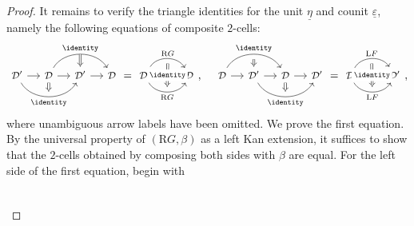 \begin{proof}
	It remains to verify the triangle identities for the unit
	$\underline{\eta}$ and counit $\underline{\varepsilon}$, namely the
	following equations of composite $2$-cells:
	\begin{equation*}\begin{gathered}
		\begin{tikzcd}[column sep=small, every cell/.append style = {font = \small}]
			\mathcal{D}' \arrow[r] \arrow[bend right=60, rr, "\identity"', "" {name=I}] & \mathcal{D} \arrow[r] \arrow[rr, bend left=60, "\identity", "" {name=J}] \arrow[Rightarrow, to=I] & \mathcal{D}' \arrow[r] \arrow[Rightarrow, from=J] & \mathcal{D}
		\end{tikzcd} = \begin{tikzcd}[every cell/.append style = {font = \small}]
			\mathcal{D}' \arrow[r, bend left=60, "{\mathrm{R}G}", ""' {name=A}] \arrow[r, bend right=60, "{\mathrm{R}G}"', "" {name=B}] & \mathcal{D} \arrow[Rightarrow, from=A, to=B, "\identity" description]
		\end{tikzcd} , \quad
		\begin{tikzcd}[column sep=small, every cell/.append style = {font = \small}]
			\mathcal{D} \arrow[r] \arrow[bend left=60, rr, "\identity", ""' {name=I}] & \mathcal{D}' \arrow[r] \arrow[Rightarrow, from=I] \arrow[bend right=60, rr, "\identity"', "" {name=J}] & \mathcal{D} \arrow[r] \arrow[Rightarrow, to=J] & \mathcal{D}'
		\end{tikzcd} = \begin{tikzcd}[every cell/.append style = {font = \small}]
			\mathcal{D} \arrow[r, bend left=60, "{\mathrm{L}F}", ""' {name=A}] \arrow[r, bend right=60, "{\mathrm{L}F}"', "" {name=B}] & \mathcal{D}' \arrow[Rightarrow, from=A, to=B, "\identity" description]
		\end{tikzcd},
	\end{gathered}\end{equation*}
	where unambiguous arrow labels have been omitted. We prove the first
	equation. By the universal property of $(\mathrm{R}G, \beta)$ as a left Kan
	extension, it suffices to show that the $2$-cells obtained by composing both
	sides with $\beta$ are equal. For the left side of the first equation, begin
	with
	\[\begin{tikzcd}[every cell/.append style = {font = \small}]

\end{tikzcd}\]
\end{proof}
